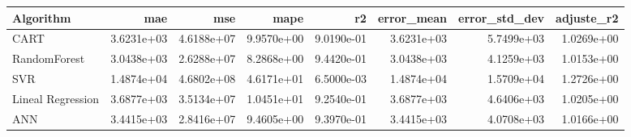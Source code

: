 \begin{tabular}{lrrrrrrr}
\toprule
Algorithm & mae & mse & mape & r2 & error_mean & error_std_dev & adjuste_r2 \\
\midrule
CART & 3.6231e+03 & 4.6188e+07 & 9.9570e+00 & 9.0190e-01 & 3.6231e+03 & 5.7499e+03 & 1.0269e+00 \\
RandomForest & 3.0438e+03 & 2.6288e+07 & 8.2868e+00 & 9.4420e-01 & 3.0438e+03 & 4.1259e+03 & 1.0153e+00 \\
SVR & 1.4874e+04 & 4.6802e+08 & 4.6171e+01 & 6.5000e-03 & 1.4874e+04 & 1.5709e+04 & 1.2726e+00 \\
Lineal Regression & 3.6877e+03 & 3.5134e+07 & 1.0451e+01 & 9.2540e-01 & 3.6877e+03 & 4.6406e+03 & 1.0205e+00 \\
ANN & 3.4415e+03 & 2.8416e+07 & 9.4605e+00 & 9.3970e-01 & 3.4415e+03 & 4.0708e+03 & 1.0166e+00 \\
\bottomrule
\end{tabular}
